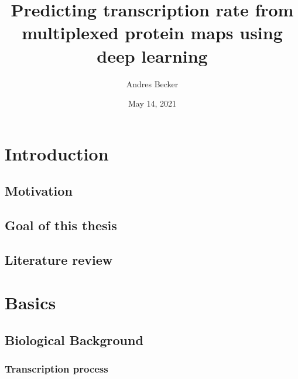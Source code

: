 \documentclass[biblatexBackend=bibtex]{tumthesis}
\author{Andres Becker}
\title{Predicting transcription rate from multiplexed protein maps using deep learning}
\institute{Chair of Mathematical Modeling of Biological Systems}
\date{May 14, 2021} %
\begin{document}
\pagestyle{empty}
\frontmatter%
\maketitlepage%





\tableofcontents%

\mainmatter%
\pagestyle{headings}

\chapter{Introduction}
\label{ch:introduction}

\section{Motivation}
\label{sec:intro:motivation}


\section{Goal of this thesis}
\label{sec:intro:goals}


\section{Literature review}
\label{ch:literature_review}




\chapter{Basics}
\label{ch:basics}


\section{Biological Background}
\label{sec:basics:bio_back}

\subsection{Transcription process}
\label{sec:basics:transcription_process}

\end{document}
